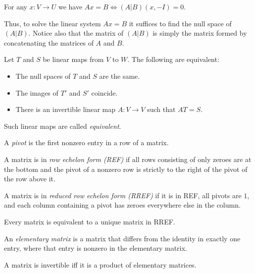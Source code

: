 \begin{prop}
  For any $x:V\to U$ we have $Ax=B\iff (A|B)(x,-I)=0$.
\end{prop}
\begin{rem}
  Thus, to solve the linear system $Ax=B$ it suffices to find the null space of
  $(A|B)$. Notice also that the matrix of $(A|B)$ is simply the matrix formed by
  concatenating the matrices of $A$ and $B$.
\end{rem}
\begin{prop}
  Let $T$ and $S$ be linear maps from $V$ to $W$. The following are equivalent:
  \begin{itemize}
    \item The null spaces of $T$ and $S$ are the same.
    \item The images of $T'$ and $S'$ coincide.
    \item There is an invertible linear map $A:V\to V$ such that $AT=S$.
  \end{itemize}
\end{prop}
\begin{defn}
  Such linear maps are called \emph{equivalent}.
\end{defn}
\begin{defn}
  A \emph{pivot} is the first nonzero entry in a row of a matrix.

  A matrix is in \emph{row echelon form (REF)} if all rows consisting
  of only zeroes are at the bottom and the pivot of a nonzero row is strictly to
  the right of the pivot of the row above it.

  A matrix is in \emph{reduced row echelon form (RREF)} if it is in REF, all
  pivots are $1$, and each column containing a pivot has zeroes everywhere else
  in the column.
\end{defn}
\begin{prop}
  Every matrix is equivalent to a unique matrix in RREF\@.
\end{prop}
\begin{defn}
  An \emph{elementary matrix} is a matrix that differs from the identity 
  in exactly one entry, where that entry is nonzero in the elementary matrix.
\end{defn}
\begin{prop}
  A matrix is invertible iff it is a product of elementary matrices.
\end{prop}
